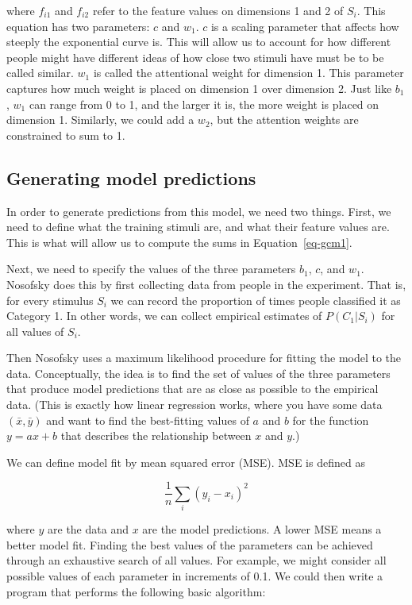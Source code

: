 \documentclass[
  letterpaper,
  DIV=11,
  numbers=noendperiod]{scrreprt}
\begin{document}
where \(f_{i1}\) and \(f_{i2}\) refer to the feature values on
dimensions 1 and 2 of \(S_i\). This equation has two parameters: \(c\)
and \(w_1\). \(c\) is a scaling parameter that affects how steeply the
exponential curve is. This will allow us to account for how different
people might have different ideas of how close two stimuli have must be
to be called similar. \(w_1\) is called the attentional weight for
dimension 1. This parameter captures how much weight is placed on
dimension 1 over dimension 2. Just like \(b_1\), \(w_1\) can range from
0 to 1, and the larger it is, the more weight is placed on dimension 1.
Similarly, we could add a \(w_2\), but the attention weights are
constrained to sum to 1.

\subsection{Generating model
predictions}\label{generating-model-predictions}

In order to generate predictions from this model, we need two things.
First, we need to define what the training stimuli are, and what their
feature values are. This is what will allow us to compute the sums in
Equation~\ref{eq-gcm1}.

Next, we need to specify the values of the three parameters \(b_1\),
\(c\), and \(w_1\). Nosofsky does this by first collecting data from
people in the experiment. That is, for every stimulus \(S_i\) we can
record the proportion of times people classified it as Category 1. In
other words, we can collect empirical estimates of \(P(C_1|S_i)\) for
all values of \(S_i\).

Then Nosofsky uses a maximum likelihood procedure for fitting the model
to the data. Conceptually, the idea is to find the set of values of the
three parameters that produce model predictions that are as close as
possible to the empirical data. (This is exactly how linear regression
works, where you have some data \((\bar{x},\bar{y})\) and want to find
the best-fitting values of \(a\) and \(b\) for the function
\(y = ax + b\) that describes the relationship between \(x\) and \(y\).)

We can define model fit by mean squared error (MSE). MSE is defined as

\[
\frac{1}{n} \sum_i (y_i - x_i)^2
\]

where \(y\) are the data and \(x\) are the model predictions. A lower
MSE means a better model fit. Finding the best values of the parameters
can be achieved through an exhaustive search of all values. For example,
we might consider all possible values of each parameter in increments of
0.1. We could then write a program that performs the following basic
algorithm:
\end{document}
